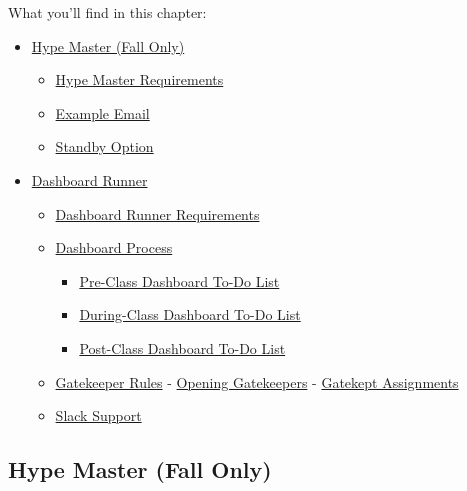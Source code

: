 \documentclass[
]{article}
\providecommand{\tightlist}{%
  \setlength{\itemsep}{0pt}\setlength{\parskip}{0pt}}
\begin{document}
What you'll find in this chapter:

\begin{itemize}
\tightlist
\item
  \protect\hyperlink{hype-master-fall-only}{Hype Master (Fall Only)}

  \begin{itemize}
  \tightlist
  \item
    \protect\hyperlink{hype-master-requirements}{Hype Master Requirements}
  \item
    \protect\hyperlink{example-email}{Example Email}
  \item
    \protect\hyperlink{standby-option}{Standby Option}
  \end{itemize}
\item
  \protect\hyperlink{dashboard-runner}{Dashboard Runner}

  \begin{itemize}
  \tightlist
  \item
    \protect\hyperlink{dashboard-runner-requirements}{Dashboard Runner Requirements}
  \item
    \protect\hyperlink{dashboard-process}{Dashboard Process}

    \begin{itemize}
    \tightlist
    \item
      \protect\hyperlink{pre-class-dashboard-to-do-list}{Pre-Class Dashboard To-Do List}
    \item
      \protect\hyperlink{during-class-dashboard-to-do-list}{During-Class Dashboard To-Do List}
    \item
      \protect\hyperlink{post-class-dashboard-to-do-list}{Post-Class Dashboard To-Do List}
    \end{itemize}
  \item
    \protect\hyperlink{gatekeeper-rules}{Gatekeeper Rules} - \protect\hyperlink{opening-gatekeepers}{Opening Gatekeepers} - \protect\hyperlink{gatekept-assignments}{Gatekept Assignments}
  \item
    \protect\hyperlink{slack-support}{Slack Support}
  \end{itemize}
\end{itemize}

\hypertarget{hype-master-fall-only}{%
\subsection{Hype Master (Fall Only)}\label{hype-master-fall-only}}
\end{document}
